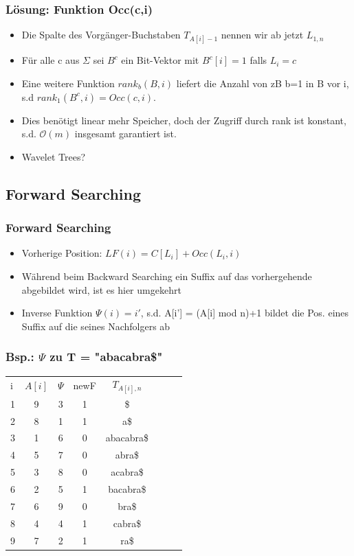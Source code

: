 \documentclass{beamer}
\begin{document}
\begin{frame}
\frametitle{L\"osung: Funktion Occ(c,i)}
\begin{itemize}
\item Die Spalte des Vorg\"anger-Buchstaben $T_{A[i]-1}$ nennen wir ab jetzt $L_{1,n}$
\item F\"ur alle c aus $\Sigma$ sei $B^{c}$ ein Bit-Vektor mit $B^{c}[i] = 1$ falls $L_{i} = c$
\item Eine weitere Funktion $rank_{b}(B,i)$ liefert die Anzahl von zB b=1 in B vor i, s.d $rank_{1}(B^{c},i) = Occ(c,i)$.
\item Dies ben\"otigt linear mehr Speicher, doch der Zugriff durch rank ist konstant, s.d. $\mathcal{O}(m)$ insgesamt garantiert ist.
\item Wavelet Trees?
\end{itemize}
\end{frame}
\begin{frame}
\subsection{Forward Searching}
\frametitle{Forward Searching}
\begin{itemize}
\item Vorherige Position: $LF(i) = C[L_i] + Occ(L_i,i)$
\item W\"ahrend beim Backward Searching ein Suffix auf das vorhergehende abgebildet wird, ist es hier umgekehrt
\item Inverse Funktion $\Psi(i) = i'$, s.d. A[i'] = (A[i] mod n)+1 bildet die Pos. eines Suffix auf die seines Nachfolgers ab
\end{itemize}
\end{frame}
\begin{frame}
\frametitle{Bsp.: $\Psi$ zu T = "abacabra\$"}
\begin{tabular}{l c cc ccc r}
i & $A[i]$ & $\Psi$ & newF & $T_{A[i],n}$ \\
1 & 9 & 3 & 1 &\$\\
2 & 8 & 1 & 1&a\$\\
3 & 1 & 6 & 0&abacabra\$\\
4 & 5 & 7 & 0&abra\$\\
5 & 3 & 8 & 0&acabra\$\\
6 & 2 & 5 & 1&bacabra\$\\
7 & 6 & 9 & 0&bra\$\\
8 & 4 & 4 & 1&cabra\$\\
9 & 7 & 2 & 1&ra\$\\
\end{tabular}
\end{frame}
\end{document}
